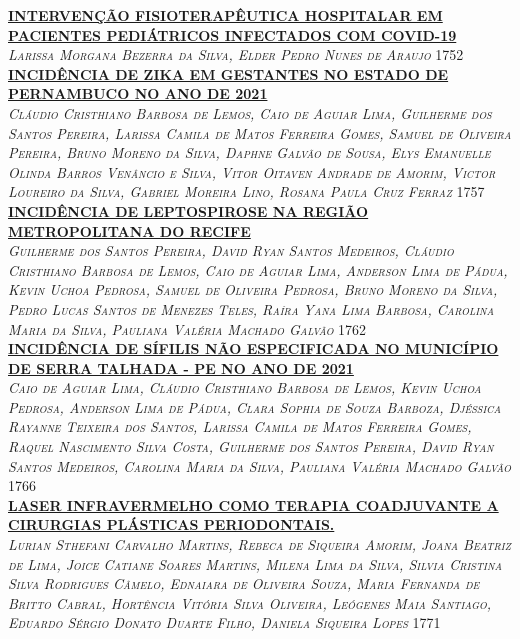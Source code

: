 \noindent \textsc{\hyperlink{trabalhos/250372.pdf.1}{\textbf{INTERVENÇÃO FISIOTERAPÊUTICA HOSPITALAR EM PACIENTES PEDIÁTRICOS INFECTADOS COM COVID-19}}}\\ 
\noindent \textsc{\textit{Larissa Morgana Bezerra da Silva, Elder Pedro Nunes de Araujo}} \hfill 1752\\ 

\noindent \textsc{\hyperlink{trabalhos/251161.pdf.1}{\textbf{INCIDÊNCIA DE ZIKA EM GESTANTES NO ESTADO DE PERNAMBUCO NO ANO DE 2021}}}\\ 
\noindent \textsc{\textit{Cláudio Cristhiano Barbosa de Lemos, Caio de Aguiar Lima, Guilherme dos Santos Pereira, Larissa Camila de Matos Ferreira Gomes, Samuel de Oliveira Pereira, Bruno Moreno da Silva, Daphne Galvão de Sousa, Elys Emanuelle Olinda Barros Venâncio e Silva, Vitor Oitaven Andrade de Amorim, Victor Loureiro da Silva, Gabriel Moreira Lino, Rosana Paula Cruz Ferraz}} \hfill 1757\\ 

\noindent \textsc{\hyperlink{trabalhos/249969.pdf.1}{\textbf{INCIDÊNCIA DE LEPTOSPIROSE NA REGIÃO METROPOLITANA DO RECIFE}}}\\ 
\noindent \textsc{\textit{Guilherme dos Santos Pereira, David Ryan Santos Medeiros, Cláudio Cristhiano Barbosa de Lemos, Caio de Aguiar Lima, Anderson Lima de Pádua, Kevin Uchoa Pedrosa, Samuel de Oliveira Pedrosa, Bruno Moreno da Silva, Pedro Lucas Santos de Menezes Teles, Raíra Yana Lima Barbosa, Carolina Maria da Silva, Pauliana Valéria Machado Galvão}} \hfill 1762\\ 

\noindent \textsc{\hyperlink{trabalhos/251726.pdf.1}{\textbf{INCIDÊNCIA DE SÍFILIS NÃO ESPECIFICADA NO MUNICÍPIO DE SERRA TALHADA - PE NO ANO DE 2021}}}\\ 
\noindent \textsc{\textit{Caio de Aguiar Lima, Cláudio Cristhiano Barbosa de Lemos, Kevin Uchoa Pedrosa, Anderson Lima de Pádua, Clara Sophia de Souza Barboza, Djéssica Rayanne Teixeira dos Santos, Larissa Camila de Matos Ferreira Gomes, Raquel Nascimento Silva Costa, Guilherme dos Santos Pereira, David Ryan Santos Medeiros, Carolina Maria da Silva, Pauliana Valéria Machado Galvão}} \hfill 1766\\ 

\noindent \textsc{\hyperlink{trabalhos/249799.pdf.1}{\textbf{LASER INFRAVERMELHO COMO  TERAPIA COADJUVANTE A CIRURGIAS PLÁSTICAS PERIODONTAIS.}}}\\ 
\noindent \textsc{\textit{Lurian Sthefani Carvalho Martins, Rebeca de Siqueira Amorim, Joana Beatriz de Lima, Joice Catiane Soares Martins, Milena Lima da Silva, Silvia Cristina Silva Rodrigues  Câmelo, Ednaiara de Oliveira Souza, Maria Fernanda de Britto Cabral, Hortência Vitória Silva Oliveira, Leógenes Maia Santiago, Eduardo Sérgio Donato Duarte Filho, Daniela Siqueira Lopes}} \hfill 1771\\ 

